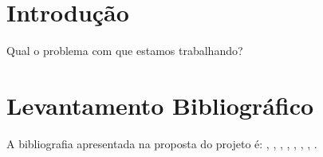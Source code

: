 \chapter{Introdução}
\label{cap:Introducao}

Qual o problema com que estamos trabalhando?

\chapter{Levantamento Bibliográfico}
\label{cap:Levantamento_Bibliografico}

A bibliografia apresentada na proposta do projeto é:
\cite{KLETTE:Concise_computer_vision},
\cite{FORSYTH:Computer_vision},
\cite{SZELISKI:Computer_vision},
\cite{PRINCE:Computer_vision},
\cite{DAVIES:Computer_and_machine_vision},
\cite{HARTLEY:Multiple_view_geometry},
\cite{SHAPIRO:Computer_vision},
\cite{TRUCCO:Introductory}.
